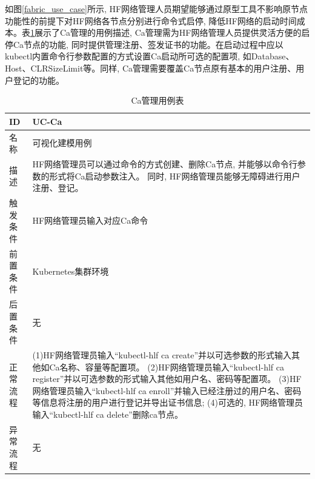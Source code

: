 如图\ref{fabric_use_case}所示, HF网络管理人员期望能够通过原型工具不影响原节点功能性的前提下对HF网络各节点分别进行命令式启停, 降低HF网络的启动时间成本。表\ref{ca_use_case}展示了Ca管理的用例描述, Ca管理需为HF网络管理人员提供灵活方便的启停Ca节点的功能, 同时提供管理注册、签发证书的功能。在启动过程中应以kubectl内置命令行参数配置的方式设置Ca启动所可选的配置项, 如Database、Host、CLRSizeLimit等。同样, Ca管理需要覆盖Ca节点原有基本的用户注册、用户登记的功能。


{\footnotesize
\begin{longtable}[h]{m{60pt}|m{280pt}}
    \caption[Ca管理用例表]{Ca管理用例表} \label{ca_use_case} \\
        \hline  
        ID&UC-Ca\\
        \hline
        名称&可视化建模用例\\
        \hline
        描述&HF网络管理员可以通过命令的方式创建、删除Ca节点, 并能够以命令行参数的形式将Ca启动参数注入。 同时, HF网络管理员能够无障碍进行用户注册、登记。\\
        \hline
        触发条件&HF网络管理员输入对应Ca命令\\
        \hline
        前置条件&Kubernetes集群环境\\
        \hline
        后置条件&无\\
        \hline
        正常流程& (1)HF网络管理员输入“kubectl-hlf ca create”并以可选参数的形式输入其他如Ca名称、容量等配置项。
        \newline (2)HF网络管理员输入“kubectl-hlf ca register”并以可选参数的形式输入其他如用户名、密码等配置项。
        \newline (3)HF网络管理员输入“kubectl-hlf ca enroll”并输入已经注册过的用户名、密码等信息将注册的用户进行登记并导出证书信息;
        \newline (4)可选的, HF网络管理员输入“kubectl-hlf ca delete”删除ca节点。\\
        \hline
        异常流程&无\\
        \hline
    \end{longtable} 
}

